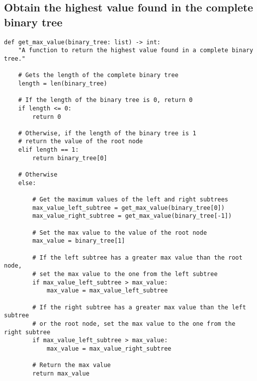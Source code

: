 \documentclass[11pt]{article}
\begin{document}
\subsection{Obtain the highest value found in the complete binary tree}
\label{sec:org03fed64}
\begin{verbatim}
def get_max_value(binary_tree: list) -> int:
    "A function to return the highest value found in a complete binary tree."

    # Gets the length of the complete binary tree
    length = len(binary_tree)

    # If the length of the binary tree is 0, return 0
    if length <= 0:
        return 0

    # Otherwise, if the length of the binary tree is 1
    # return the value of the root node
    elif length == 1:
        return binary_tree[0]

    # Otherwise
    else:

        # Get the maximum values of the left and right subtrees
        max_value_left_subtree = get_max_value(binary_tree[0])
        max_value_right_subtree = get_max_value(binary_tree[-1])

        # Set the max value to the value of the root node
        max_value = binary_tree[1]

        # If the left subtree has a greater max value than the root node,
        # set the max value to the one from the left subtree
        if max_value_left_subtree > max_value:
            max_value = max_value_left_subtree

        # If the right subtree has a greater max value than the left subtree
        # or the root node, set the max value to the one from the right subtree
        if max_value_left_subtree > max_value:
            max_value = max_value_right_subtree

        # Return the max value
        return max_value
\end{verbatim}

 \newpage
\end{document}
